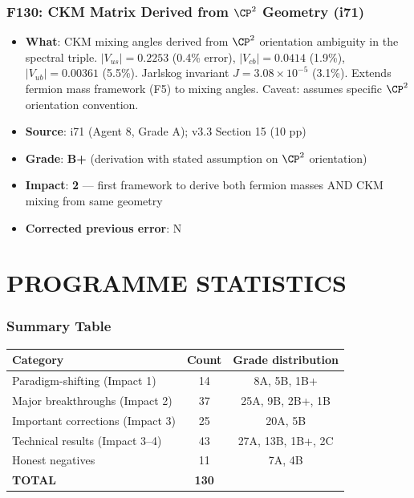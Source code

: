 \documentclass[11pt,a4paper]{article}
\newcommand{\grade}[1]{\textbf{#1}}
\newcommand{\impact}[1]{\textbf{#1}}
\begin{document}
\section{F130: CKM Matrix Derived from $\CP^2$ Geometry (i71)}
\begin{itemize}[nosep]
\item \textbf{What}: CKM mixing angles derived from $\CP^2$ orientation ambiguity in the spectral triple. $|V_{us}| = 0.2253$ (0.4\% error), $|V_{cb}| = 0.0414$ (1.9\%), $|V_{ub}| = 0.00361$ (5.5\%). Jarlskog invariant $J = 3.08 \times 10^{-5}$ (3.1\%). Extends fermion mass framework (F5) to mixing angles. Caveat: assumes specific $\CP^2$ orientation convention.
\item \textbf{Source}: i71 (Agent 8, Grade A); v3.3 Section 15 (10 pp)
\item \textbf{Grade}: \grade{B+} (derivation with stated assumption on $\CP^2$ orientation)
\item \textbf{Impact}: \impact{2} --- first framework to derive both fermion masses AND CKM mixing from same geometry
\item \textbf{Corrected previous error}: N
\end{itemize}


\part{PROGRAMME STATISTICS}
\label{part:stats}

\section{Summary Table}

\begin{center}
\begin{tabular}{lcc}
\toprule
\textbf{Category} & \textbf{Count} & \textbf{Grade distribution} \\
\midrule
Paradigm-shifting (Impact 1) & 14 & 8A, 5B, 1B+ \\
Major breakthroughs (Impact 2) & 37 & 25A, 9B, 2B+, 1B \\
Important corrections (Impact 3) & 25 & 20A, 5B \\
Technical results (Impact 3--4) & 43 & 27A, 13B, 1B+, 2C \\
Honest negatives & 11 & 7A, 4B \\
\midrule
\textbf{TOTAL} & \textbf{130} & \\
\bottomrule
\end{tabular}
\end{center}
\end{document}
